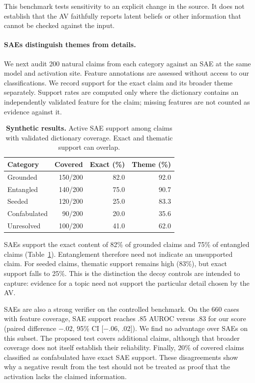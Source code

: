 This benchmark tests sensitivity to an explicit change in the source. It does
not establish that the AV faithfully reports latent beliefs or other information
that cannot be checked against the input.

\paragraph{SAEs distinguish themes from details.}
We next audit 200 natural claims from each category against an SAE at the same
model and activation site. Feature annotations are assessed without access to
our classifications. We record support for the exact claim and its broader theme separately. Support rates are computed only where
the dictionary contains an independently validated feature for the claim;
missing features are not counted as evidence against it.

\begin{table}[ht]
\centering\small
\setlength{\tabcolsep}{4pt}
\begin{tabular}{lrrr}
\hline
Category & Covered & Exact (\%) & Theme (\%) \\
\hline
Grounded & 150/200 & 82.0 & 92.0 \\
Entangled & 140/200 & 75.0 & 90.7 \\
Seeded & 120/200 & 25.0 & 83.3 \\
Confabulated & 90/200 & 20.0 & 35.6 \\
Unresolved & 100/200 & 41.0 & 62.0 \\
\hline
\end{tabular}
\caption{\textbf{Synthetic results.} Active SAE support among claims with
validated dictionary coverage. Exact and thematic support can overlap.}
\label{tab:grounding-sae}
\end{table}

SAEs support the exact content of 82\% of grounded claims and 75\% of entangled
claims (Table~\ref{tab:grounding-sae}). Entanglement therefore need not indicate
an unsupported claim. For seeded claims, thematic support remains high (83\%),
but exact support falls to 25\%. This is the distinction the decoy controls
are intended to capture: evidence for a topic need not support the particular
detail chosen by the AV.

SAEs are also a strong verifier on the controlled benchmark. On the 660 cases
with feature coverage, SAE support reaches .85 AUROC versus .83 for our score
(paired difference $-.02$, 95\% CI [$-.06$, $.02$]). We find no advantage over
SAEs on this subset. The proposed test covers additional claims, although that
broader coverage does not itself establish their reliability. Finally, 20\%
of covered claims classified as confabulated have exact SAE support. These
disagreements show why a negative result from the test should not be treated
as proof that the activation lacks the claimed information.
